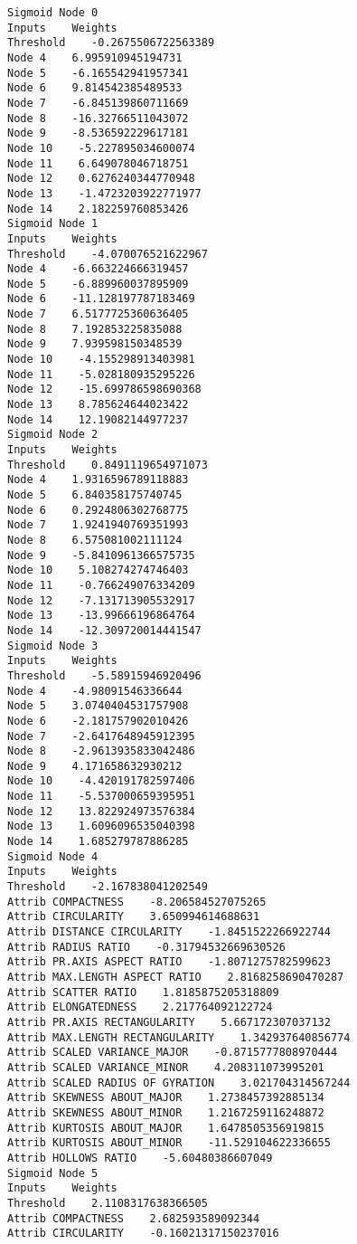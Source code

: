 \documentclass[
	article,			%
	11pt,				%
	oneside,			%
	a4paper,			%
	english,			%
	brazil,				%
	sumario=tradicional
	]{abntex2}
\begin{document}
\begin{lstlisting}
Sigmoid Node 0
Inputs    Weights
Threshold    -0.2675506722563389
Node 4    6.995910945194731
Node 5    -6.165542941957341
Node 6    9.814542385489533
Node 7    -6.845139860711669
Node 8    -16.32766511043072
Node 9    -8.536592229617181
Node 10    -5.227895034600074
Node 11    6.649078046718751
Node 12    0.6276240344770948
Node 13    -1.4723203922771977
Node 14    2.182259760853426
Sigmoid Node 1
Inputs    Weights
Threshold    -4.070076521622967
Node 4    -6.663224666319457
Node 5    -6.889960037895909
Node 6    -11.128197787183469
Node 7    6.5177725360636405
Node 8    7.192853225835088
Node 9    7.939598150348539
Node 10    -4.155298913403981
Node 11    -5.028180935295226
Node 12    -15.699786598690368
Node 13    8.785624644023422
Node 14    12.19082144977237
Sigmoid Node 2
Inputs    Weights
Threshold    0.8491119654971073
Node 4    1.9316596789118883
Node 5    6.840358175740745
Node 6    0.2924806302768775
Node 7    1.9241940769351993
Node 8    6.575081002111124
Node 9    -5.8410961366575735
Node 10    5.108274274746403
Node 11    -0.766249076334209
Node 12    -7.131713905532917
Node 13    -13.99666196864764
Node 14    -12.309720014441547
Sigmoid Node 3
Inputs    Weights
Threshold    -5.58915946920496
Node 4    -4.98091546336644
Node 5    3.0740404531757908
Node 6    -2.181757902010426
Node 7    -2.6417648945912395
Node 8    -2.9613935833042486
Node 9    4.171658632930212
Node 10    -4.420191782597406
Node 11    -5.537000659395951
Node 12    13.822924973576384
Node 13    1.6096096535040398
Node 14    1.685279787886285
Sigmoid Node 4
Inputs    Weights
Threshold    -2.167838041202549
Attrib COMPACTNESS    -8.206584527075265
Attrib CIRCULARITY    3.650994614688631
Attrib DISTANCE CIRCULARITY    -1.8451522266922744
Attrib RADIUS RATIO    -0.31794532669630526
Attrib PR.AXIS ASPECT RATIO    -1.8071275782599623
Attrib MAX.LENGTH ASPECT RATIO    2.8168258690470287
Attrib SCATTER RATIO    1.8185875205318809
Attrib ELONGATEDNESS    2.217764092122724
Attrib PR.AXIS RECTANGULARITY    5.667172307037132
Attrib MAX.LENGTH RECTANGULARITY    1.342937640856774
Attrib SCALED VARIANCE_MAJOR    -0.8715777808970444
Attrib SCALED VARIANCE_MINOR    4.208311073995201
Attrib SCALED RADIUS OF GYRATION    3.021704314567244
Attrib SKEWNESS ABOUT_MAJOR    1.2738457392885134
Attrib SKEWNESS ABOUT_MINOR    1.2167259116248872
Attrib KURTOSIS ABOUT_MAJOR    1.6478505356919815
Attrib KURTOSIS ABOUT_MINOR    -11.529104622336655
Attrib HOLLOWS RATIO    -5.60480386607049
Sigmoid Node 5
Inputs    Weights
Threshold    2.1108317638366505
Attrib COMPACTNESS    2.682593589092344
Attrib CIRCULARITY    -0.16021317150237016

\end{lstlisting}
\end{document}
